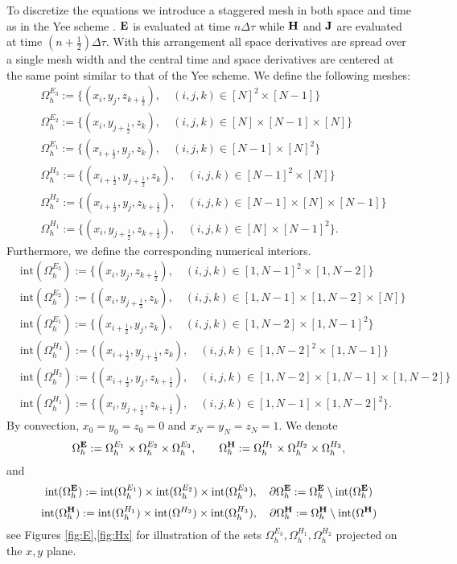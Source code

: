 \documentclass[12pt,reqno]{amsart}
\newcommand{\e}{{\bf E}}
\newcommand{\h}{{\bf H}}
\theoremstyle{definition}
\numberwithin{equation}{section}
\def\Gw{\Omega}     \def\Gx{\Xi}         \def\Gy{\Psi}
\def\Gwh{\Omega_h}
\begin{document}
	 	 To discretize the equations we introduce a staggered mesh in both space and time as in the Yee scheme \cite{yee}. 
$\e$ is  evaluated at time $n\Delta \tau$ while $\bf{H}$ and $\bf{J}$ are evaluated at time $(n\!+\! \frac{1}{2})\Delta \tau$.
	With this arrangement all space derivatives are spread over a single mesh width and the central time and space derivatives
	are centered at the same point similar to that of the Yee scheme. 
	We define the following meshes:
	\begin{align}\label{eq:meshes}
		&\Gwh^{E_3}:=\{(x_i,y_j,z_{k+\frac{1}{2}}),\quad (i,j,k)\in [N]^2 \times[N-1]\} \\\nonumber
		& \Gwh^{E_2}:=\{(x_i,y_{j+\frac{1}{2}},z_{k}), \quad (i,j,k)\in [N]\times [N-1] \times[N] \}\\\nonumber
		& \Gwh^{E_1}:=\{ (x_{i+\frac{1}{2}},y_{j},z_{k}),\quad (i,j,k) \in [N-1]\times [N]^2 \} \\ \nonumber
		&\Gwh^{H_3}:=\{ (x_{i+\frac{1}{2}},y_{j+\frac{1}{2}},z_{k}),\quad (i,j,k)\in [N-1]^2\times[N] \}\\ \nonumber
		&\Gwh^{H_2}:=\{ (x_{i+\frac{1}{2}},y_j,z_{k+\frac{1}{2}}),\quad (i,j,k) \in [N-1]\times [N] \times [N-1] \}\\ \nonumber
		& \Gwh^{H_1}:=\{ (x_i,y_{j+\frac{1}{2}},z_{k+\frac{1}{2}}), \quad (i,j,k) \in [N]\times [N-1]^2\}.\nonumber
	\end{align}
Furthermore, we define the corresponding numerical interiors.
	\begin{align}\label{eq:interior_meshes}
	&\mathrm{int}(\Gwh^{E_3}):=\{(x_i,y_j,z_{k+\frac{1}{2}}),\quad (i,j,k)\in [1,N-1]^2 \times[1,N-2]\} \\ \nonumber
	&\mathrm{int}( \Gwh^{E_2}):=\{(x_i,y_{j+\frac{1}{2}},z_{k}), \quad (i,j,k)\in [1,N-1]\times [1,N-2] \times[N] \}\\  \nonumber
	& \mathrm{int}(\Gwh^{E_1}):=\{ (x_{i+\frac{1}{2}},y_{j},z_{k}),\quad (i,j,k) \in [1,N-2]\times [1,N-1]^2 \} \\  \nonumber
	&\mathrm{int}(\Gwh^{H_3}):=\{ (x_{i+\frac{1}{2}},y_{j+\frac{1}{2}},z_{k}),\quad (i,j,k)\in [1,N-2]^2\times[1,N-1] \}\\ \nonumber
	&\mathrm{int}(\Gwh^{H_2}):=\{ (x_{i+\frac{1}{2}},y_j,z_{k+\frac{1}{2}}),\quad (i,j,k) \in [1,N-2]\times [1,N-1] \times [1,N-2] \}\\ \nonumber
	& \mathrm{int}(\Gwh^{H_1}):=\{ (x_i,y_{j+\frac{1}{2}},z_{k+\frac{1}{2}}), \quad (i,j,k) \in [1,N-1]\times [1,N-2]^2\}. \nonumber
\end{align}
By convection, $x_0=y_0=z_0=0$ and $x_N=y_N=z_N=1$.
	We denote 
$$
\Gwh^{{\bf E}}:=\Gwh^{E_1}\times \Gwh^{E_2}\times \Gwh^{E_3}, \qquad 
\Gwh^{\bf H}:=
\Gwh^{H_1}\times \Gwh^{H_2}\times \Gwh^{H_3},
$$
and 
$$
\mathrm{int}(\Gwh^{{\e}}):=\mathrm{int}(\Gwh^{E_1})\times \mathrm{int}(\Gwh^{E_2})\times \mathrm{int}(\Gwh^{E_3}),
\quad \partial \Gwh^\e:=\Gwh^\e\setminus  \mathrm{int}(\Gwh^{\e})
$$
$$
\mathrm{int}(\Gwh^{\h}):=
\mathrm{int}(\Gwh^{H_1})\times \mathrm{int}(\Gw^{H_2})\times \mathrm{int}(\Gwh^{H_3}),
\quad \partial \Gwh^\h:=\Gwh^\h\setminus  \mathrm{int}(\Gw^{\h})
$$
see Figures \ref{fig:E},\ref{fig:Hx} for illustration of the sets 
$\Gwh^{E_3}, \Gwh^{H_1},\Gwh^{H_2}$ projected on the $x,y$ plane.
\end{document}
